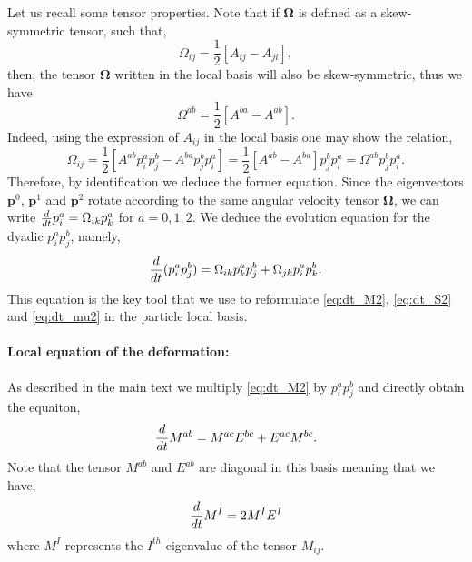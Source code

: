 Let us recall some tensor properties. 
Note that if $\bm{\Omega}$ is defined as a skew-symmetric tensor, such that, 
\begin{equation}
    \Omega_{ij} = \frac{1}{2} [A_{ij}-A_{ji}],
\end{equation}
then, the tensor $\bm\Omega$ written in the local basis will also be skew-symmetric, thus we have
\begin{equation}
    \Omega^{ab} = \frac{1}{2} [A^{ba}-A^{ab}]. 
\end{equation}
Indeed, using the expression of $A_{ij}$ in the local basis one may show the relation, 
\begin{equation}
    \Omega_{ij} = \frac{1}{2} [A^{ab} p^a_i p^b_j-A^{ba} p^b_j p^a_i]
    =  \frac{1}{2} [A^{ab} - A^{ba} ]p^b_j p^a_i
    =  \Omega^{ab} p^b_j p^a_i. 
\end{equation}
Therefore, by identification we deduce the former equation. 
Since the eigenvectors $\textbf{p}^0$, $\textbf{p}^1$ and  $\textbf{p}^2$ rotate according to the same angular velocity tensor $\bm\Omega$, we can write $\frac{d}{dt} p_i^a =\Omega_{ik} p_k^a$ for $a =0,1,2$. 
We deduce the evolution equation for the dyadic $p_i^ap_j^b$, namely,
\begin{equation*}
    \ddt(p_i^ap_j^b)
    = 
    \Omega_{ik} p_k^ap_j^b
    + \Omega_{jk} p_i^ap_k^b.
    \label{eq:orientation_pp}
\end{equation*}
This equation is the key tool that we use to reformulate \ref{eq:dt_M2}, \ref{eq:dt_S2} and \ref{eq:dt_mu2} in the particle local basis. 

\paragraph*{Local equation of the deformation:}
As described in the main text we multiply \ref{eq:dt_M2} by $p_i^ap_j^b$ and directly obtain the equaiton, 
\begin{equation*}
    \frac{d}{dt} M^{ab}
    = 
    M^{ac} E^{bc} 
    + E^{ac} M^{bc}. 
\end{equation*}
Note that the tensor $M^{ab}$ and $E^{ab}$ are diagonal in this basis meaning that we have, 
\begin{equation*}
    \frac{d}{dt} M^I
    = 
    2 M^I E^I
\end{equation*}
where $M^I$ represents the $I^{th}$ eigenvalue of the tensor $M_{ij}$. 

